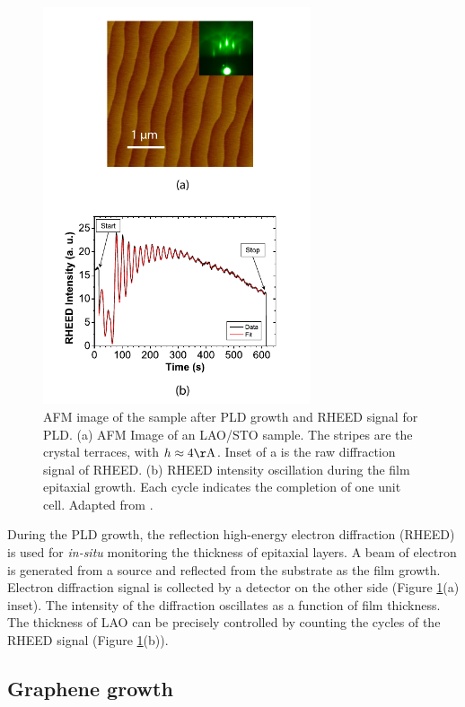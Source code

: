 \documentclass[pdflatex, sectionletters, 12pt]{pittetd}    %
\begin{document}
\begin{figure}[hp!]
	\centering
	\includegraphics[width=0.7\textwidth]{Drawing/PLD_RHEED.pdf}
	\caption{AFM image of the sample after PLD growth and RHEED signal for PLD. (a) AFM Image of an LAO/STO sample. The stripes are the crystal terraces, with $h \approx 4 \mathrm{\AA}$. Inset of a is the raw diffraction signal of RHEED. (b) RHEED intensity oscillation during the film epitaxial growth. Each cycle indicates the completion of one unit cell. Adapted from \cite{podkaminer2016real}.}
	\label{FIG:RHEED}
\end{figure}

During the PLD growth, the reflection high-energy electron diffraction (RHEED) is used for \emph{in-situ} monitoring the thickness of epitaxial layers. A beam of electron is generated from a source and reflected from the substrate as the film growth. Electron diffraction signal is collected by a detector on the other side (Figure \ref{FIG:RHEED}(a) inset). The intensity of the diffraction oscillates as a function of film thickness. The thickness of LAO can be precisely controlled by counting the cycles of the RHEED signal (Figure \ref{FIG:RHEED}(b)).

\subsection{Graphene growth}
\end{document}
